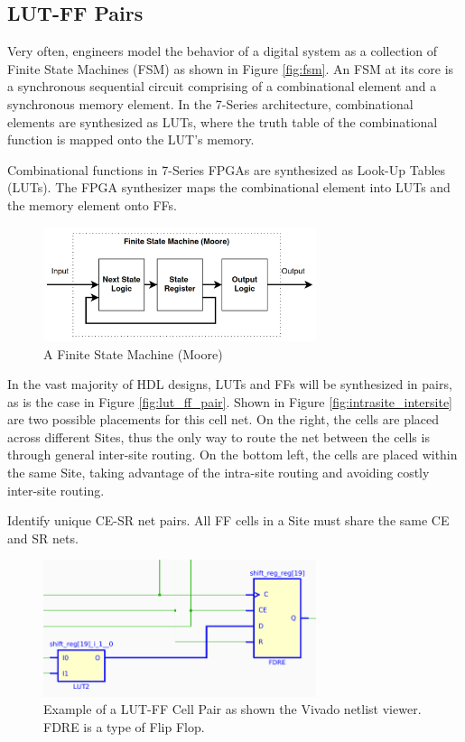 \documentclass[twocolumn]{article}
\begin{document}
        \subsection{LUT-FF Pairs}
            Very often, engineers model the behavior of a digital system as a collection of Finite State Machines (FSM) as shown in Figure \ref{fig:fsm}. 
            An FSM at its core is a synchronous sequential circuit comprising of a combinational element and a synchronous memory element. 
            In the 7-Series architecture, combinational elements are synthesized as LUTs, where the truth table of the combinational function is mapped onto the LUT's memory. 

            Combinational functions in 7-Series FPGAs are synthesized as Look-Up Tables (LUTs). 
            The FPGA synthesizer maps the combinational element into LUTs and the memory element onto FFs. 

            \begin{figure}[H]
                \centering
                \includegraphics[width=8.0cm]{figures/fsm.png}
                \caption{A Finite State Machine (Moore)}
            \end{figure}

            In the vast majority of HDL designs, LUTs and FFs will be synthesized in pairs, as is the case in Figure \ref{fig:lut_ff_pair}. 
            Shown in Figure \ref{fig:intrasite_intersite} are two possible placements for this cell net. 
            On the right, the cells are placed across different Sites, thus the only way to route the net between the cells is through general inter-site routing. 
            On the bottom left, the cells are placed within the same Site, taking advantage of the intra-site routing and avoiding costly inter-site routing. 

            Identify unique CE-SR net pairs. 
            All FF cells in a Site must share the same CE and SR nets. 

            \begin{figure}[H]
                \centering
                \includegraphics[width=8.0cm]{figures/lut_ff_pair.png}
                \caption{
                    Example of a LUT-FF Cell Pair as shown the Vivado netlist viewer. 
                    FDRE is a type of Flip Flop. 
                }
            \end{figure}
\end{document}
